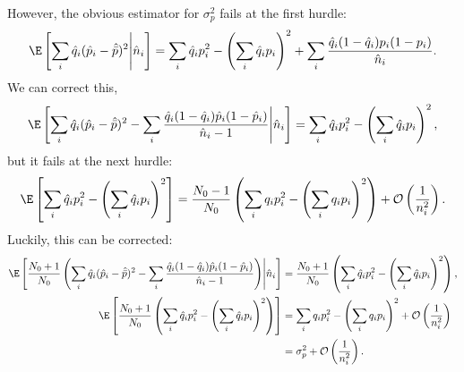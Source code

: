 \documentclass[12pt]{article}
\begin{document}
However, the obvious estimator for $\sigma_p^2$ fails at the first hurdle:
%
\begin{equation}\label{eq:sigest1}
  \E\brk{\sum_i\hat{q}_i(\hat{p}_i-\hat{\bar{p}})^2\middle|\hat{n}_i} = \sum_i \hat{q}_i p_i^2 - \prn{\sum_i \hat{q}_ip_i}^2 + \sum_i \frac{\hat{q}_i (1-\hat{q}_i)p_i(1-p_i)}{\hat{n}_i}.
\end{equation}
%
We can correct this,
%
\begin{equation}\label{eq:sigest2}
  \E\brk{\sum_i\hat{q}_i(\hat{p}_i-\hat{\bar{p}})^2 - \sum_i \frac{\hat{q}_i (1-\hat{q}_i)\hat{p}_i(1-\hat{p}_i)}{\hat{n}_i-1} \middle|\hat{n}_i} = \sum_i \hat{q}_i p_i^2 - \prn{\sum_i \hat{q}_ip_i}^2 ,
\end{equation}
%
but it fails at the next hurdle:
%
\begin{equation}\label{eq:sigest3}
  \E\brk{\sum_i \hat{q}_i p_i^2 - \prn{\sum_i \hat{q}_ip_i}^2 } = \frac{N_0-1}{N_0}\prn{\sum_i q_i p_i^2 - \prn{\sum_i q_ip_i}^2} + \CO\prn{\frac{1}{n_i^2}}.
\end{equation}
%
Luckily, this can be corrected:
%
\begin{equation}\label{eq:sigest4}
\begin{aligned}
  \E\brk{\frac{N_0+1}{N_0}\prn{\sum_i\hat{q}_i(\hat{p}_i-\hat{\bar{p}})^2 - \sum_i \frac{\hat{q}_i (1-\hat{q}_i)\hat{p}_i(1-\hat{p}_i)}{\hat{n}_i-1} } \middle|\hat{n}_i} &= \frac{N_0+1}{N_0}\prn{\sum_i \hat{q}_i p_i^2 - \prn{\sum_i \hat{q}_ip_i}^2} ,\\
  \E\brk{\frac{N_0+1}{N_0}\prn{\sum_i \hat{q}_i p_i^2 - \prn{\sum_i \hat{q}_ip_i}^2} } &= \sum_i q_i p_i^2 - \prn{\sum_i q_ip_i}^2 + \CO\prn{\frac{1}{n_i^2}} \\&= \sigma_p^2 + \CO\prn{\frac{1}{n_i^2}}.
\end{aligned}
\end{equation}
%
















\end{document}
